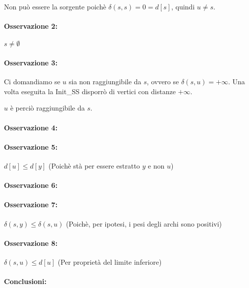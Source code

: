 {Non può essere la sorgente poichè $\delta(s,s)=0=d[s]$, quindi $u\neq s$.}

\paragraph{Osservazione 2:}

$s \neq \emptyset$

\paragraph{Osservazione 3:}

Ci domandiamo se $u$ sia non raggiungibile da $s$, ovvero se $\delta(s,u)=+\infty$.
Una volta eseguita la Init\_SS disporrò di vertici con distanze $+\infty$.

$u$ è perciò raggiungibile da $s$.

\paragraph{Osservazione 4:}

\paragraph{Osservazione 5:}

$d[u] \leq d[y]$ (Poichè stà per essere estratto $y$ e non $u$)

\paragraph{Osservazione 6:}

\paragraph{Osservazione 7:}

$\delta(s,y) \leq \delta(s,u)$ (Poichè, per ipotesi, i pesi degli archi sono positivi)

\paragraph{Osservazione 8:}

$\delta(s,u) \leq d[u]$ (Per proprietà del limite inferiore)

\paragraph{Conclusioni:}

